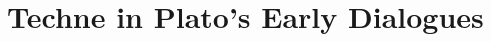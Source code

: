 ﻿\documentclass[11pt]{amsart}
\begin{document}
\section{Techne in Plato's Early Dialogues}















\end{document}
